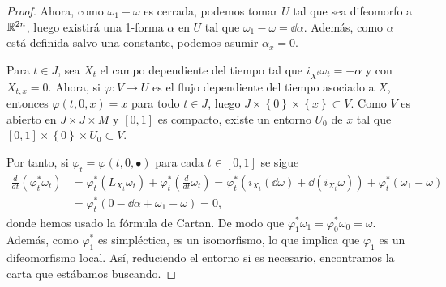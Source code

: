 \begin{proof}
  Ahora, como $\omega_1-\omega$ es cerrada, podemos tomar $U$ tal que sea difeomorfo a $\mathbb{R}^{2n}$, luego existirá una 1-forma $\alpha$ en $U$ tal que $\omega_1-\omega=\dd \alpha$. Además, como $\alpha$ está definida salvo una constante, podemos asumir $\alpha_x=0$.

  Para $t \in J$, sea $X_t$ el campo dependiente del tiempo tal que $i_{X^t}\omega_t= - \alpha$ y con $X_{t,x}=0$. Ahora, si $\varphi:V\rightarrow U$ es el flujo dependiente del tiempo asociado a $X$, entonces $\varphi(t,0,x)=x$ para todo $t\in J$, luego $J\times \left\{ 0 \right\}\times \left\{ x \right\} \subset V$. Como $V$ es abierto en $J\times J\times M$ y $[0,1]$ es compacto, existe un entorno $U_0$ de $x$  tal que $[0,1]\times \left\{ 0 \right\}\times U_0 \subset V$. 
  
  Por tanto, si $\varphi_t = \varphi(t,0,\bullet)$ para cada $t\in [0,1]$ se sigue
  \begin{align*}
    \frac{d}{dt}(\varphi_t^*\omega_t) & = \varphi_t^* (L_{X_t}\omega_t) + \varphi_t^* \left( \frac{d}{dt}\omega_t \right) = \varphi_t^* (i_{X_t}(\dd \omega)+\dd (i_{X_t}\omega))+\varphi_t^*(\omega_1-\omega) \\
    & = \varphi_t^*(0-\dd \alpha + \omega_1 - \omega) = 0,
  \end{align*}
  donde hemos usado la fórmula de Cartan. De modo que $\varphi_1^*\omega_1=\varphi_0^*\omega_0=\omega$. Además, como $\varphi_1^*$ es simpléctica, es un isomorfismo, lo que implica que $\varphi_1$ es un difeomorfismo local. Así, reduciendo el entorno si es necesario, encontramos la carta que estábamos buscando.
\end{proof}

